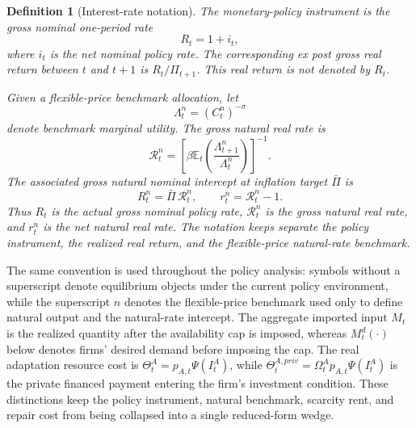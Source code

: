 ﻿\documentclass[12pt]{article}
\newtheorem{definition}{Definition}
\theoremstyle{remark}
\newcommand{\E}{\mathbb E}
\begin{document}
\begin{definition}[Interest-rate notation]\label{def:interest_rate_notation}
The monetary-policy instrument is the gross nominal one-period rate
\begin{equation}
    R_t=1+i_t,
    \label{eq:R_nominal_definition}
\end{equation}
where $i_t$ is the net nominal policy rate. The corresponding ex post gross real return between
$t$ and $t+1$ is $R_t/\Pi_{t+1}$. This real return is not denoted by $R_t$.

Given a flexible-price benchmark allocation, let
\begin{equation}
    \Lambda_t^n=(C_t^n)^{-\sigma}
    \label{eq:natural_muc}
\end{equation}
denote benchmark marginal utility. The gross natural real rate is
\begin{equation}
    \mathcal R_t^n
    =
    \left[
        \beta
        \E_t
        \left(
            \frac{\Lambda_{t+1}^n}{\Lambda_t^n}
        \right)
    \right]^{-1}.
    \label{eq:gross_natural_real_rate}
\end{equation}
The associated gross natural nominal intercept at inflation target $\bar\Pi$ is
\begin{equation}
    R_t^n=\bar\Pi\,\mathcal R_t^n,
    \qquad
    r_t^n=\mathcal R_t^n-1.
    \label{eq:natural_nominal_intercept}
\end{equation}
Thus $R_t$ is the actual gross nominal policy rate, $\mathcal R_t^n$ is the gross natural real
rate, and $r_t^n$ is the net natural real rate. The notation keeps separate the policy instrument,
the realized real return, and the flexible-price natural-rate benchmark.
\end{definition}

The same convention is used throughout the policy analysis: symbols without a superscript denote
equilibrium objects under the current policy environment, while the superscript $n$ denotes the
flexible-price benchmark used only to define natural output and the natural-rate intercept. The
aggregate imported input $M_t$ is the realized quantity after the availability cap is imposed,
whereas $M_t^d(\cdot)$ below denotes firms' desired demand before imposing the cap. The real
adaptation resource cost is $\Theta_t^A=p_{A,t}\Psi(I_t^A)$, while
$\Theta_t^{A,priv}=\Omega_t^Ap_{A,t}\Psi(I_t^A)$ is the private financed payment entering the
firm's investment condition. These distinctions keep the policy instrument, natural benchmark,
scarcity rent, and repair cost from being collapsed into a single reduced-form wedge.
\end{document}
